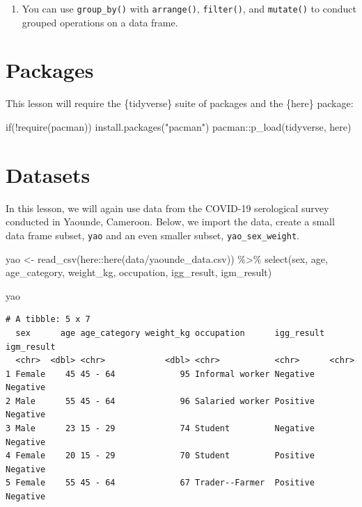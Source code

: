 \documentclass[
  letterpaper,
  DIV=11,
  numbers=noendperiod]{scrreprt}
\newenvironment{Shaded}{\begin{snugshade}}{\end{snugshade}}
\newcommand{\ControlFlowTok}[1]{\textcolor[rgb]{0.00,0.23,0.31}{#1}}
\newcommand{\FunctionTok}[1]{\textcolor[rgb]{0.28,0.35,0.67}{#1}}
\newcommand{\NormalTok}[1]{\textcolor[rgb]{0.00,0.23,0.31}{#1}}
\newcommand{\OtherTok}[1]{\textcolor[rgb]{0.00,0.23,0.31}{#1}}
\newcommand{\SpecialCharTok}[1]{\textcolor[rgb]{0.37,0.37,0.37}{#1}}
\newcommand{\StringTok}[1]{\textcolor[rgb]{0.13,0.47,0.30}{#1}}
\providecommand{\tightlist}{%
  \setlength{\itemsep}{0pt}\setlength{\parskip}{0pt}}\usepackage{longtable,booktabs,array}
\begin{document}
\begin{enumerate}
\def\labelenumi{\arabic{enumi}.}
\tightlist
\item
  You can use \texttt{group\_by()} with \texttt{arrange()},
  \texttt{filter()}, and \texttt{mutate()} to conduct grouped operations
  on a data frame.
\end{enumerate}

\hypertarget{packages-6}{%
\section{Packages}\label{packages-6}}

This lesson will require the \{tidyverse\} suite of packages and the
\{here\} package:

\begin{Shaded}
\begin{Highlighting}[]
\ControlFlowTok{if}\NormalTok{(}\SpecialCharTok{!}\FunctionTok{require}\NormalTok{(pacman)) }\FunctionTok{install.packages}\NormalTok{(}\StringTok{"pacman"}\NormalTok{)}
\NormalTok{pacman}\SpecialCharTok{::}\FunctionTok{p\_load}\NormalTok{(tidyverse, here)}
\end{Highlighting}
\end{Shaded}

\hypertarget{datasets-2}{%
\section{Datasets}\label{datasets-2}}

In this lesson, we will again use data from the COVID-19 serological
survey conducted in Yaounde, Cameroon. Below, we import the data, create
a small data frame subset, \texttt{yao} and an even smaller subset,
\texttt{yao\_sex\_weight}.

\begin{Shaded}
\begin{Highlighting}[]
\NormalTok{yao }\OtherTok{\textless{}{-}} 
  \FunctionTok{read\_csv}\NormalTok{(here}\SpecialCharTok{::}\FunctionTok{here}\NormalTok{(}\StringTok{\textquotesingle{}data/yaounde\_data.csv\textquotesingle{}}\NormalTok{))  }\SpecialCharTok{\%\textgreater{}\%} 
  \FunctionTok{select}\NormalTok{(sex, age, age\_category, weight\_kg, occupation, igg\_result, igm\_result)}

\NormalTok{yao}
\end{Highlighting}
\end{Shaded}

\begin{verbatim}
# A tibble: 5 x 7
  sex      age age_category weight_kg occupation      igg_result igm_result
  <chr>  <dbl> <chr>            <dbl> <chr>           <chr>      <chr>     
1 Female    45 45 - 64             95 Informal worker Negative   Negative  
2 Male      55 45 - 64             96 Salaried worker Positive   Negative  
3 Male      23 15 - 29             74 Student         Negative   Negative  
4 Female    20 15 - 29             70 Student         Positive   Negative  
5 Female    55 45 - 64             67 Trader--Farmer  Positive   Negative  
\end{verbatim}
\end{document}

